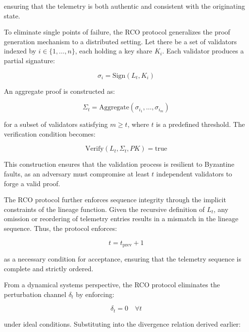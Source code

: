 ensuring that the telemetry is both authentic and consistent with the originating state.

To eliminate single points of failure, the RCO protocol generalizes the proof generation mechanism to a distributed setting. Let there be a set of validators indexed by $i \in \{1, \dots, n\}$, each holding a key share $K_i$. Each validator produces a partial signature:

\begin{equation}
\sigma_i = \text{Sign}(L_t, K_i)
\end{equation}

An aggregate proof is constructed as:

\begin{equation}
\Sigma_t = \text{Aggregate}(\sigma_{i_1}, \dots, \sigma_{i_m})
\end{equation}

for a subset of validators satisfying $m \geq t$, where $t$ is a predefined threshold. The verification condition becomes:

\begin{equation}
\text{Verify}(L_t, \Sigma_t, PK) = \text{true}
\end{equation}

This construction ensures that the validation process is resilient to Byzantine faults, as an adversary must compromise at least $t$ independent validators to forge a valid proof.

The RCO protocol further enforces sequence integrity through the implicit constraints of the lineage function. Given the recursive definition of $L_t$, any omission or reordering of telemetry entries results in a mismatch in the lineage sequence. Thus, the protocol enforces:

\begin{equation}
t = t_{\text{prev}} + 1
\end{equation}

as a necessary condition for acceptance, ensuring that the telemetry sequence is complete and strictly ordered.

From a dynamical systems perspective, the RCO protocol eliminates the perturbation channel $\delta_t$ by enforcing:

\begin{equation}
\delta_t = 0 \quad \forall t
\end{equation}

under ideal conditions. Substituting into the divergence relation derived earlier:

